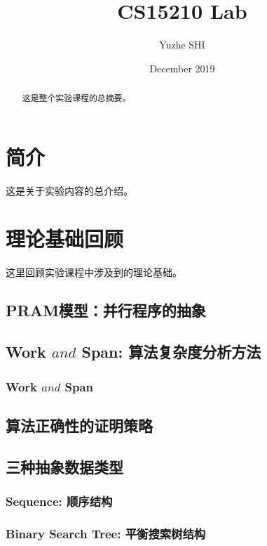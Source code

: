 \documentclass{ctexrep}
\title{CS15210 Lab}
\author{Yuzhe SHI}
\date{December 2019}
\begin{document}
\maketitle
\tableofcontents

\begin{abstract}
    这是整个实验课程的总摘要。
\end{abstract}

\chapter{简介}
这是关于实验内容的总介绍。

\chapter{理论基础回顾}
这里回顾实验课程中涉及到的理论基础。
\section{PRAM模型：并行程序的抽象}


\section{Work $and$ Span: 算法复杂度分析方法}
\subsection{Work $and$ Span}


\section{算法正确性的证明策略}


\section{三种抽象数据类型}
\subsection{Sequence: 顺序结构}
\subsection{Binary Search Tree: 平衡搜索树结构}
\end{document}
